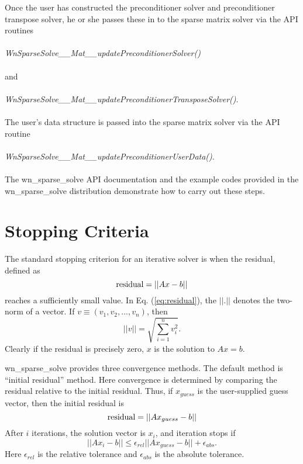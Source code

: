\documentclass{article}    %
\begin{document}
Once the user has constructed the preconditioner solver and preconditioner
transpose solver, he or she passes these in to the sparse matrix solver
via the API routines\\ \\
{\em WnSparseSolve\_\_Mat\_\_updatePreconditionerSolver()}
\\ \\
and
\\ \\
{\em WnSparseSolve\_\_Mat\_\_updatePreconditionerTransposeSolver()}.
\\ \\
The user's data structure is passed into the sparse matrix solver via
the API routine
\\ \\
{\em WnSparseSolve\_\_Mat\_\_updatePreconditionerUserData()}.
\\ \\ 
The wn\_sparse\_solve API documentation and the example codes provided in
the wn\_sparse\_solve distribution demonstrate how to carry out these steps.

\section{Stopping Criteria}

The standard stopping criterion for an iterative solver is when the residual,
defined as
\begin{equation}
{\rm residual} = || Ax - b ||
\label{eq:residual}
\end{equation}
reaches a sufficiently small value.  In Eq. (\ref{eq:residual}), the $||.||$
denotes the two-norm of a vector.  If $v \equiv (v_1, v_2, ..., v_n)$, then
\begin{equation}
||v|| = \sqrt{\sum_{i=1}^n v_i^2}.
\end{equation}
Clearly if the residual is precisely zero, $x$ is the solution to $Ax = b$.

wn\_sparse\_solve provides three convergence methods.  The default method
is ``initial residual'' method.  Here convergence is determined by comparing
the residual relative to the initial residual.  Thus, if $x_{guess}$
is the user-supplied guess vector, then the initial residual is
\begin{equation}
{\rm residual} = || Ax_{guess} - b ||
\label{eq:initial_residual}
\end{equation}
After $i$ iterations, the solution vector is $x_i$, and iteration stops
if
\begin{equation}
|| Ax_{i} - b || \leq \epsilon_{rel}|| Ax_{guess} - b || + \epsilon_{abs}.
\label{eq:initial_residual_convergence}
\end{equation}
Here $\epsilon_{rel}$ is the relative tolerance and $\epsilon_{abs}$ is
the absolute tolerance.
\end{document}
